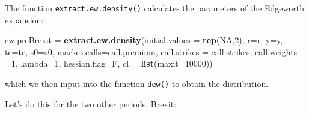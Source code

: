 \documentclass[]{book}
\newenvironment{Shaded}{\begin{snugshade}}{\end{snugshade}}
\newcommand{\KeywordTok}[1]{\textcolor[rgb]{0.13,0.29,0.53}{\textbf{#1}}}
\newcommand{\DataTypeTok}[1]{\textcolor[rgb]{0.13,0.29,0.53}{#1}}
\newcommand{\DecValTok}[1]{\textcolor[rgb]{0.00,0.00,0.81}{#1}}
\newcommand{\StringTok}[1]{\textcolor[rgb]{0.31,0.60,0.02}{#1}}
\newcommand{\OtherTok}[1]{\textcolor[rgb]{0.56,0.35,0.01}{#1}}
\newcommand{\OperatorTok}[1]{\textcolor[rgb]{0.81,0.36,0.00}{\textbf{#1}}}
\newcommand{\NormalTok}[1]{#1}
\theoremstyle{definition}
\theoremstyle{definition}
\theoremstyle{definition}
\theoremstyle{remark}
\begin{document}
The function \texttt{extract.ew.density()} calculates the parameters of
the Edgeworth expansion:

\begin{Shaded}
\begin{Highlighting}[]
\NormalTok{ew.preBrexit =}\StringTok{ }\KeywordTok{extract.ew.density}\NormalTok{(}\DataTypeTok{initial.values =} \KeywordTok{rep}\NormalTok{(}\OtherTok{NA}\NormalTok{,}\DecValTok{2}\NormalTok{), }\DataTypeTok{r=}\NormalTok{r, }\DataTypeTok{y=}\NormalTok{y, }\DataTypeTok{te=}\NormalTok{te, }\DataTypeTok{s0=}\NormalTok{s0, }
                       \DataTypeTok{market.calls=}\NormalTok{call.premium, }\DataTypeTok{call.strikes =}\NormalTok{ call.strikes, }
                       \DataTypeTok{call.weights =}\DecValTok{1}\NormalTok{, }\DataTypeTok{lambda=}\DecValTok{1}\NormalTok{, }\DataTypeTok{hessian.flag=}\NormalTok{F, }\DataTypeTok{cl =} \KeywordTok{list}\NormalTok{(}\DataTypeTok{maxit=}\DecValTok{10000}\NormalTok{))}
\end{Highlighting}
\end{Shaded}

which we then input into the function \texttt{dew()} to obtain the
distribution.

\begin{Shaded}
\end{Shaded}

Let's do this for the two other periods, Brexit:
\end{document}

